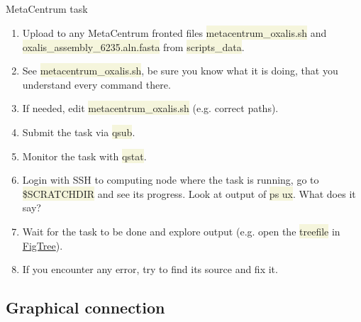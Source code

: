 \documentclass[compress, xelatex, 11pt, xcolor=svgnames, aspectratio=169, url={hyphens, lowtilde}]{beamer}
\renewcommand{\texttt}[1]{\colorbox{Beige}{{\ttfamily #1}}}
\begin{document}
\subsection{}

\begin{frame}{MetaCentrum task}
	\begin{enumerate}
		\item Upload to any MetaCentrum fronted files \texttt{metacentrum\_oxalis.sh} and \texttt{oxalis\_assembly\_6235.aln.fasta} from \texttt{scripts\_data}.
		\item See \texttt{metacentrum\_oxalis.sh}, be sure you know what it is doing, that you understand every command there.
		\item If needed, edit \texttt{metacentrum\_oxalis.sh} (e.g. correct paths).
		\item Submit the task via \texttt{qsub}.
		\item Monitor the task with \texttt{qstat}.
		\item Login with SSH to computing node where the task is running, go to \texttt{\$SCRATCHDIR} and see its progress. Look at output of \texttt{ps ux}. What does it say?
		\item Wait for the task to be done and explore output (e.g. open the \texttt{treefile} in \href{https://tree.bio.ed.ac.uk/software/figtree/}{FigTree}).
		\item If you encounter any error, try to find its source and fix it.
	\end{enumerate}
\end{frame}

\subsection{Graphical connection}
\end{document}
